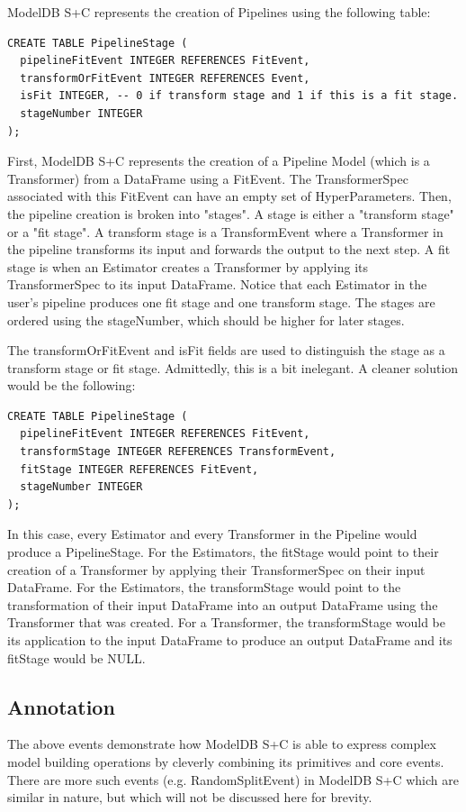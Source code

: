ModelDB S+C represents the creation of Pipelines using the following table:

\begin{verbatim}
CREATE TABLE PipelineStage (
  pipelineFitEvent INTEGER REFERENCES FitEvent,
  transformOrFitEvent INTEGER REFERENCES Event,
  isFit INTEGER, -- 0 if transform stage and 1 if this is a fit stage.
  stageNumber INTEGER 
);
\end{verbatim}

First, ModelDB S+C represents the creation of a Pipeline Model (which is a Transformer) from
a DataFrame using a FitEvent. The TransformerSpec associated with this FitEvent can have an empty
set of HyperParameters. Then, the pipeline creation is broken into "stages". A stage is either a 
"transform stage" or a "fit stage". A transform stage is a TransformEvent where a Transformer in the pipeline
transforms its input and forwards the output to the next step. A fit stage is when an Estimator creates a Transformer
by applying its TransformerSpec to its input DataFrame. Notice that each Estimator in the user's pipeline produces
one fit stage and one transform stage. The stages are ordered using the stageNumber, which should be higher for later
stages.

The transformOrFitEvent and isFit fields are used to distinguish the stage as a transform stage or fit stage. Admittedly,
this is a bit inelegant. A cleaner solution would be the following:

\begin{verbatim}
CREATE TABLE PipelineStage (
  pipelineFitEvent INTEGER REFERENCES FitEvent,
  transformStage INTEGER REFERENCES TransformEvent,
  fitStage INTEGER REFERENCES FitEvent,
  stageNumber INTEGER 
);
\end{verbatim}

In this case, every Estimator and every Transformer in the Pipeline would produce a PipelineStage. For the Estimators,
the fitStage would point to their creation of a Transformer by applying their TransformerSpec on their input DataFrame.
For the Estimators, the transformStage would point to the transformation of their input DataFrame into an output DataFrame 
using the Transformer that was created. For a Transformer, the transformStage would be its application to the input DataFrame
to produce an output DataFrame and its fitStage would be NULL.

\subsection{Annotation}
The above events demonstrate how ModelDB S+C is able to express complex model building operations by
cleverly combining its primitives and core events. There are more such events (e.g. RandomSplitEvent) in
ModelDB S+C which are similar in nature, but which will not be discussed here for brevity.

